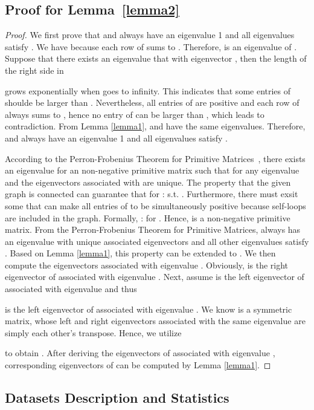 \documentclass[sigconf]{acmart}
\begin{document}
\subsection{Proof for Lemma~\ref{lemma2}}\label{Sec:proof2}
\begin{proof}
We first prove that  and
 always have an eigenvalue 1
and all eigenvalues  satisfy . We have  because each row of
 sums to . Therefore, 
is an eigenvalue of .
Suppose that there exists an eigenvalue  that
 with eigenvector
, then the length of the right side in

grows exponentially when  goes to infinity. This indicates
that some entries of  
shoulde be larger than . Nevertheless, all entries of
 are positive and each row
of  always sums to ,
hence no entry of  can be
larger than , which leads to contradiction. From Lemma \ref{lemma1},
 and
 have the same eigenvalues.
Therefore,  and
 always have an eigenvalue 1
and all eigenvalues  satisfy .

According to the Perron-Frobenius Theorem for Primitive
Matrices~\cite{seneta2006non}, there exists an eigenvalue 
for an  non-negative primitive matrix such that
 for any eigenvalue 
and the eigenvectors associated with  are unique. The
property that the given graph is connected can guarantee that
for :  s.t.
. Furthermore,
there must exsit some  that can make all entries of
 to be simultaneously positive
because self-loops are included in the graph. Formally,
:  for
. Hence,  is a
non-negative primitive matrix. From the Perron-Frobenius
Theorem for Primitive Matrices,
 always has an eigenvalue
 with unique associated eigenvectors and all other
eigenvalues  satisfy .
Based on Lemma \ref{lemma1}, this property can be extended to
. We then compute the
eigenvectors associated with eigenvalue . Obviously,
 is the right eigenvector of
 associated with eigenvalue
. Next, assume  is the left eigenvector
of  associated with
eigenvalue  and thus

is the left eigenvector of 
associated with eigenvalue . We know
 is a symmetric matrix, whose
left and right eigenvectors associated with the same
eigenvalue are simply each other's transpose. Hence, we
utilize

to obtain  . After deriving the
eigenvectors of  associated
with eigenvalue , corresponding eigenvectors of
 can be computed by Lemma
\ref{lemma1}.
\end{proof}

\subsection{Datasets Description and Statistics}\label{Sec:dataset}
\end{document}
